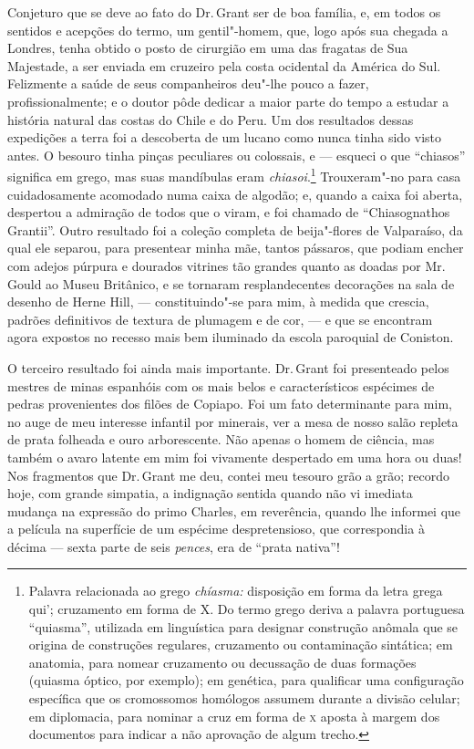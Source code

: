 Conjeturo que se deve ao fato do Dr.\,Grant ser de boa família, e,
em todos os sentidos e acepções do termo, um gentil"-homem, que, logo
após sua chegada a Londres, tenha obtido o posto de cirurgião em uma das
fragatas de Sua Majestade, a ser enviada em cruzeiro pela costa
ocidental da América do Sul. Felizmente a saúde de seus companheiros
deu"-lhe pouco a fazer, profissionalmente; e o doutor pôde dedicar a
maior parte do tempo a estudar a história natural das costas do Chile e
do Peru. Um dos resultados dessas expedições a terra foi a descoberta de
um lucano como nunca tinha sido visto antes. O besouro tinha pinças
peculiares ou colossais, e --- esqueci o que ``chiasos'' significa em
grego, mas suas mandíbulas eram \textit{chiasoi}.\footnote{Palavra
  relacionada ao grego \textit{chíasma:} disposição em forma da letra
  grega qui'; cruzamento em forma de X. Do termo grego deriva a palavra
  portuguesa ``quiasma'', utilizada em linguística para designar
  construção anômala que se origina de construções regulares, cruzamento
  ou contaminação sintática; em anatomia, para nomear cruzamento ou
  decussação de duas formações (quiasma óptico, por exemplo); em
  genética, para qualificar uma configuração específica que os
  cromossomos homólogos assumem durante a divisão celular; em
  diplomacia, para nominar a cruz em forma de \textsc{x} aposta à margem dos
  documentos para indicar a não aprovação de algum trecho.} Trouxeram"-no para casa cuidadosamente acomodado numa caixa de
algodão; e, quando a caixa foi aberta, despertou a admiração de todos
que o viram, e foi chamado de ``Chiasognathos Grantii''. Outro resultado
foi a coleção completa de beija"-flores de Valparaíso, da qual ele
separou, para presentear minha mãe, tantos pássaros, que podiam encher
com adejos púrpura e dourados vitrines tão grandes quanto as doadas por
Mr.\,Gould ao Museu Britânico, e se tornaram resplandecentes decorações na
sala de desenho de Herne Hill, --- constituindo"-se para mim, à medida que
crescia, padrões definitivos de textura de plumagem e de cor, --- e que se
encontram agora expostos no recesso mais bem iluminado da escola
paroquial de Coniston.

O terceiro resultado foi ainda mais importante. Dr.\,Grant foi
presenteado pelos mestres de minas espanhóis com os mais belos e
característicos espécimes de pedras provenientes dos filões de Copiapo.
Foi um fato determinante para mim, no auge de meu interesse infantil por
minerais, ver a mesa de nosso salão repleta de prata folheada e ouro
arborescente. Não apenas o homem de ciência, mas também o avaro latente
em mim foi vivamente despertado em uma hora ou duas! Nos fragmentos que
Dr.\,Grant me deu, contei meu tesouro grão a grão; recordo hoje, com
grande simpatia, a indignação sentida quando não vi imediata mudança na
expressão do primo Charles, em reverência, quando lhe informei que a
película na superfície de um espécime despretensioso, que correspondia à
décima --- sexta parte de seis \textit{pences}, era de ``prata nativa''!

